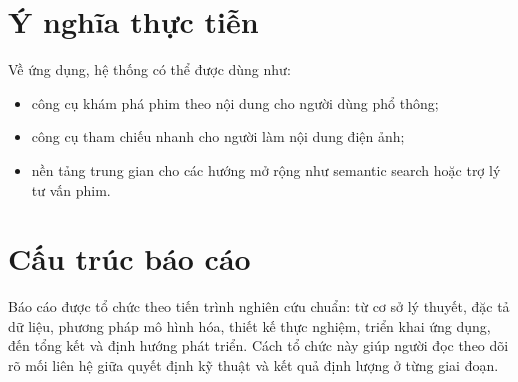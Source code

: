 \section{Ý nghĩa thực tiễn}
Về ứng dụng, hệ thống có thể được dùng như:
\begin{itemize}
    \item công cụ khám phá phim theo nội dung cho người dùng phổ thông;
    \item công cụ tham chiếu nhanh cho người làm nội dung điện ảnh;
    \item nền tảng trung gian cho các hướng mở rộng như semantic search hoặc trợ lý tư vấn phim.
\end{itemize}

\section{Cấu trúc báo cáo}
Báo cáo được tổ chức theo tiến trình nghiên cứu chuẩn: từ cơ sở lý thuyết, đặc tả dữ liệu, phương pháp mô hình hóa, thiết kế thực nghiệm, triển khai ứng dụng, đến tổng kết và định hướng phát triển. Cách tổ chức này giúp người đọc theo dõi rõ mối liên hệ giữa quyết định kỹ thuật và kết quả định lượng ở từng giai đoạn.
